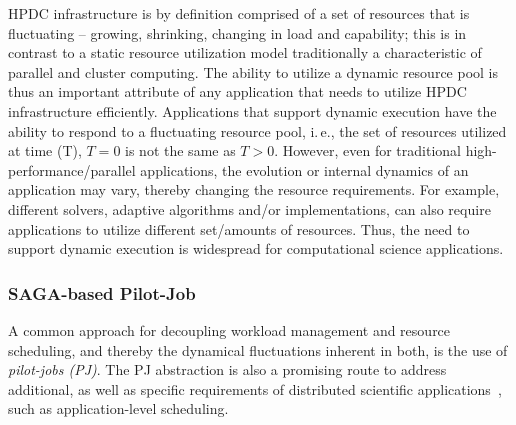 \documentclass[]{svjour3}
\begin{document}

HPDC infrastructure is by definition comprised of a set of resources
that is fluctuating -- growing, shrinking, changing in load and
capability; this is in contrast to a static resource utilization model
traditionally a characteristic of parallel and cluster computing.  The
ability to utilize a dynamic resource pool is thus an important
attribute of any application that needs to utilize HPDC infrastructure
efficiently. Applications that support dynamic execution have the
ability to respond to a fluctuating resource pool, i.\,e., the set of
resources utilized at time (T), $T=0$ is not the same as $T>0$.
However, even for traditional high-performance/parallel applications,
the evolution or internal dynamics of an application may vary, thereby
changing the resource requirements.  For example, different solvers,
adaptive algorithms and/or implementations, can also require
applications to utilize different set/amounts of resources.  Thus, the
need to support dynamic execution is widespread for computational
science applications.


\subsubsection{SAGA-based Pilot-Job}

A common approach for decoupling workload management and resource
scheduling, and thereby the dynamical fluctuations inherent in both,
is the use of \emph{pilot-jobs (PJ)}.  The PJ abstraction is also a
promising route to address additional, as well as specific
requirements of distributed scientific
applications~\cite{ko-efficient,bigjob_cloudcom10}, such as
application-level scheduling.
 
\end{document}
